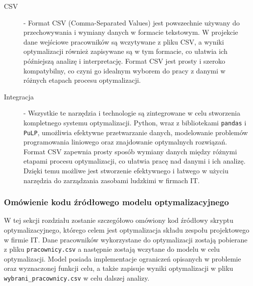 \begin{description}
        \item[CSV] - Format CSV (Comma-Separated Values) jest powszechnie używany do przechowywania i wymiany danych w formacie tekstowym. W projekcie dane wejściowe pracowników są wczytywane z pliku CSV, a wyniki optymalizacji również zapisywane są w tym formacie, co ułatwia ich późniejszą analizę i interpretację. Format CSV jest prosty i szeroko kompatybilny, co czyni go idealnym wyborem do pracy z danymi w różnych etapach procesu optymalizacji.
        
        \item[Integracja] - Wszystkie te narzędzia i technologie są zintegrowane w celu stworzenia kompletnego systemu optymalizacji. Python, wraz z bibliotekami \verb|pandas| i \verb|PuLP|, umożliwia efektywne przetwarzanie danych, modelowanie problemów programowania liniowego oraz znajdowanie optymalnych rozwiązań. Format CSV zapewnia prosty sposób wymiany danych między różnymi etapami procesu optymalizacji, co ułatwia pracę nad danymi i ich analizę. Dzięki temu możliwe jest stworzenie efektywnego i łatwego w użyciu narzędzia do zarządzania zasobami ludzkimi w firmach IT.
        
    \end{description}
        
    \subsubsection{Omówienie kodu źródłowego modelu optymalizacyjnego}
    \par W tej sekcji rozdziału zostanie szczegółowo omówiony kod źródłowy skryptu optymalizacyjnego, którego celem jest optymalizacja składu zespołu projektowego w firmie IT. Dane pracowników wykorzystane do optymalizacji zostają pobierane z pliku \verb|pracownicy.csv| a następnie zostają wczytane do modelu w celu optymalizacji. Model posiada implementacje ograniczeń opisanych w problemie oraz wyznaczonej funkcji celu, a także zapisuje wyniki optymalizacji w pliku \verb|wybrani_pracownicy.csv| w celu dalszej analizy.

    

